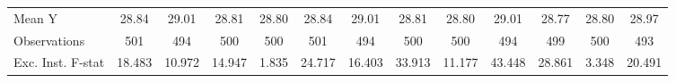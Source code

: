 {\begin{tabular}{l*{12}{c}}
\midrule
Mean Y      &       28.84         &       29.01         &       28.81         &       28.80         &       28.84         &       29.01         &       28.81         &       28.80         &       29.01         &       28.77         &       28.80         &       28.97         \\
Observations&         501         &         494         &         500         &         500         &         501         &         494         &         500         &         500         &         494         &         499         &         500         &         493         \\
Exc. Inst. F-stat&      18.483         &      10.972         &      14.947         &       1.835         &      24.717         &      16.403         &      33.913         &      11.177         &      43.448         &      28.861         &       3.348         &      20.491         \\
\bottomrule
\end{tabular}
}
